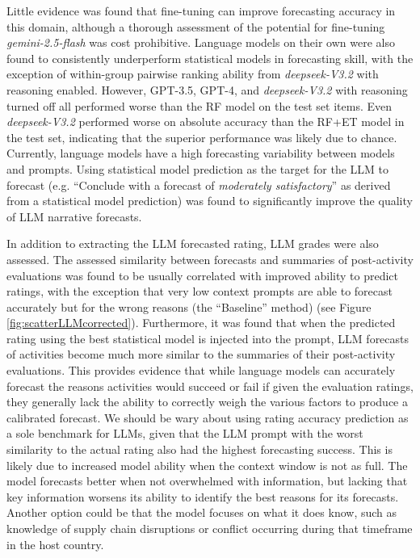 Little evidence was found that fine-tuning can improve forecasting accuracy in this domain, although a thorough assessment of the potential for fine-tuning \emph{gemini-2.5-flash} was cost prohibitive. Language models on their own were also found to consistently underperform statistical models in forecasting skill, with the exception of within-group pairwise ranking ability from \emph{deepseek-V3.2} with reasoning enabled. However, GPT-3.5, GPT-4, and \emph{deepseek-V3.2} with reasoning turned off all performed worse than the RF model on the test set items. Even \emph{deepseek-V3.2} performed worse on absolute accuracy than the RF+ET model in the test set, indicating that the superior performance was likely due to chance. Currently, language models have a high forecasting variability between models and prompts. Using statistical model prediction as the target for the LLM to forecast (e.g. ``Conclude with a forecast of \emph{moderately satisfactory}'' as derived from a statistical model prediction) was found to significantly improve the quality of LLM narrative forecasts.

In addition to extracting the LLM forecasted rating, LLM grades were also assessed. The assessed similarity between forecasts and summaries of post-activity evaluations was found to be usually correlated with improved ability to predict ratings, with the exception that very low context prompts are able to forecast accurately but for the wrong reasons (the ``Baseline'' method) (see Figure \ref{fig:scatterLLMcorrected}). Furthermore, it was found that when the predicted rating using the best statistical model is injected into the prompt, LLM forecasts of activities become much more similar to the summaries of their post-activity evaluations. This provides evidence that while language models can accurately forecast the reasons activities would succeed or fail if given the evaluation ratings, they generally lack the ability to correctly weigh the various factors to produce a calibrated forecast. We should be wary about using rating accuracy prediction as a sole benchmark for LLMs, given that the LLM prompt with the worst similarity to the actual rating also had the highest forecasting success. This is likely due to increased model ability when the context window is not as full. The model forecasts better when not overwhelmed with information, but lacking that key information worsens its ability to identify the best reasons for its forecasts. Another option could be that the model focuses on what it does know, such as knowledge of supply chain disruptions or conflict occurring during that timeframe in the host country.

